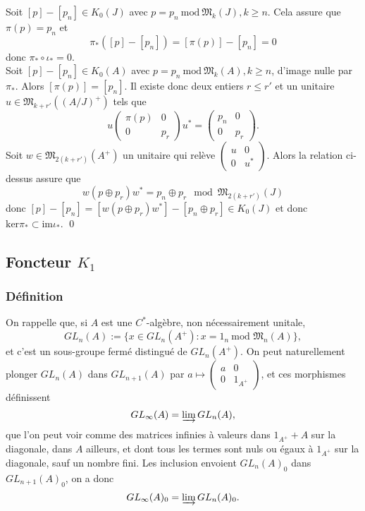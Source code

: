 \begin{dem}
Soit $[p]-[p_n]\in K_0(J)$ avec $p=p_n \ \text{mod} \ \mathfrak M_k(J), k\geq n $. Cela assure que $\pi(p)=p_n$ et 
\[\pi_*([p]-[p_n])=[\pi(p)]-[p_n]=0\]
donc $\pi_*\circ \iota_*=0$.\\

Soit $[p]-[p_n]\in K_0(A)$ avec $p=p_n \ \text{mod} \ \mathfrak M_k(A), k\geq n $, d'image nulle par $\pi_*$. Alors $[\pi(p)]=[p_n]$. Il existe donc deux entiers $r\leq r'$ et un unitaire $u\in \mathfrak M_{k+r'}((A/J)^+)$ tels que 
\[u\begin{pmatrix}\pi(p) & 0 \\ 0 & p_r \end{pmatrix} u^* = \begin{pmatrix}p_n & 0 \\0 & p_r\end{pmatrix}.\]
Soit $w\in \mathfrak M_{2(k+r')}(A^+)$ un unitaire qui relève $\begin{pmatrix}u & 0 \\ 0 & u^*\end{pmatrix}$. Alors la relation ci-dessus assure que 
\[w(p \oplus p_r )w^* = p_n\oplus p_r \mod \mathfrak M_{2(k+r')}(J)\]
donc $[p]-[p_n]= [w(p\oplus p_r)w^*]-[p_n\oplus p_r]\in K_0(J)$ et donc $\text{ker} \pi_*\subset \text{im} \iota_* $.
\qed
\end{dem}

\subsection{Foncteur $K_1$}
\subsubsection{Définition}
On rappelle que, si $A$ est une $C^*$-algèbre, non nécessairement unitale, 
\[GL_n(A):= \{x\in GL_n(A^+) : x= 1_n \ \text{mod }\mathfrak M_n(A) \},\]
et c'est un sous-groupe fermé distingué de $GL_n(A^+)$. On peut naturellement plonger $GL_n(A)$ dans $GL_{n+1}(A)$ par 
$a\mapsto \begin{pmatrix}a & 0\\0 & 1_{A^+}\end{pmatrix}$, et ces morphismes définissent
\[GL_\infty(A)= \varinjlim GL_n(A),\]
que l'on peut voir comme des matrices infinies à valeurs dans $1_{A^+}+A$ sur la diagonale, dans $A$ ailleurs, et dont tous les termes sont nuls ou égaux à $1_{A^+}$ sur la diagonale, sauf un nombre fini. Les inclusion envoient $GL_n(A)_0$ dans $GL_{n+1}(A)_0$, on a donc 
\[GL_\infty(A)_0=\varinjlim GL_n(A)_0.\]

